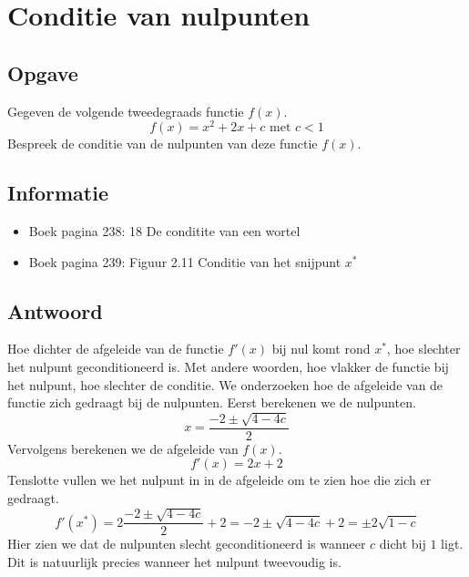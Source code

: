\documentclass[examenvragen.tex]{subfiles}
\begin{document}
\section{Conditie van nulpunten}

\subsection{Opgave}
Gegeven de volgende tweedegraads functie $f(x)$.
\[
f(x) = x^{2} + 2x + c \text{ met } c < 1
\]
Bespreek de conditie van de nulpunten van deze functie $f(x)$.

\subsection{Informatie}
\begin{itemize}
\item Boek pagina 238: 18 De conditite van een wortel
\item Boek pagina 239: Figuur 2.11 Conditie van het snijpunt $x^{*}$
\end{itemize}

\subsection{Antwoord}
Hoe dichter de afgeleide van de functie $f'(x)$ bij nul komt rond $x^{*}$, hoe slechter het nulpunt geconditioneerd is. Met andere woorden, hoe vlakker de functie bij het nulpunt, hoe slechter de conditie.
We onderzoeken hoe de afgeleide van de functie zich gedraagt bij de nulpunten.
Eerst berekenen we de nulpunten.
\[
x = \frac{-2 \pm \sqrt{4-4c}}{2}
\]
Vervolgens berekenen we de afgeleide van $f(x)$.
\[
f'(x) = 2x+2
\]
Tenslotte vullen we het nulpunt in in de afgeleide om te zien hoe die zich er gedraagt.
\[
f'(x^*) = 2 \frac{-2 \pm \sqrt{4-4c}}{2} + 2 = -2 \pm \sqrt{4-4c} + 2 = \pm 2\sqrt{1-c}
\]
Hier zien we dat de nulpunten slecht geconditioneerd is wanneer $c$ dicht bij $1$ ligt. Dit is natuurlijk precies wanneer het nulpunt tweevoudig is.
\end{document}
